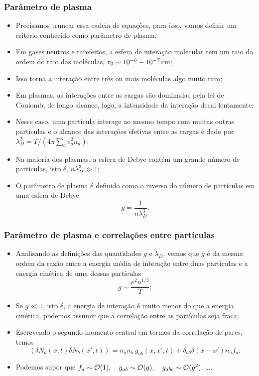 \documentclass[10pt,aspectratio=1610,lualatex]{beamer}
\begin{document}
\begin{frame}[noframenumbering]
  \frametitle{Parâmetro de plasma}
  \begin{itemize}
\item Precisamos truncar essa cadeia de equações, para isso, vamos definir um
  critério conhecido como parâmetro de plasma:
\item Em gases neutros e rarefeitos, a esfera de interação molecular
  tem um raio da ordem do raio das moléculas, $r_0 \sim \unit[10^{-8}-10^{-7}]{cm}$;
\item Isso torna a interação entre três ou mais moléculas algo muito raro;
\item Em plasmas, as interações entre as cargas são dominadas pela lei de Coulomb,
  de longo alcance, logo, a intensidade da interação decai lentamente;
\item Nesse caso, uma partícula interage ao mesmo tempo com muitas outras partículas
  e o alcance das interações efetivas entre as cargas é dado por
  $\lambda_D^2=T/(4\pi \sum_a e_a^2 n_a)$;
\item Na maioria dos plasmas, a esfera de Debye contém um grande número de
  partículas, isto é, $n\lambda_D^3 \gg 1$;
\item O parâmetro de plasma é definido como o inverso do número de partículas em uma
  esfera de Debye
  \begin{equation}
  g=\frac{1}{n\lambda_D^3}.
  \label{plasma-parameter}
  \end{equation}
  \end{itemize}
\end{frame}

\begin{frame}[noframenumbering]
  \frametitle{Parâmetro de plasma e correlações entre partículas}
  \begin{itemize}
\item Analisando as definições das quantidades $g$ e $\lambda_D$, vemos que
  $g$ é da mesma ordem da razão entre a energia média de interação entre duas
  partículas e a energia cinética de uma dessas partículas
  \begin{equation}
  g\sim \frac{e^2n^{1/3}}{T};
  \end{equation}
\item Se $g\ll 1$, isto é, a energia de interação é muito menor do que a energia
  cinética, podemos assumir que a correlação entre as partículas seja fraca;
\item Escrevendo o segundo momento central em termos da correlação de pares, temos
  \begin{equation}
  \left<\delta N_a(x,t) \delta N_b(x',t)\right>
  =n_an_b\ g_{ab}(x,x',t)+\delta_{ab}\delta(x-x')n_af_a;
  \label{pares}
  \end{equation}
\item Podemos supor que $f_a \sim {\cal O}(1),\ \,\,\,\, g_{ab}\sim {\cal O}(g),\
  \,\,\,\, g_{abc}\sim {\cal O}(g^2),\ ...$
  \end{itemize}
\end{frame}
\end{document}
